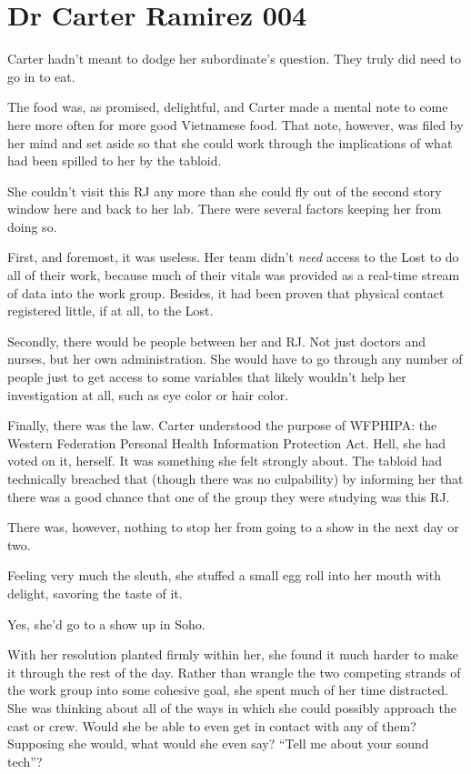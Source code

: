 \chapter*{Dr Carter Ramirez 004}

Carter hadn't meant to dodge her subordinate's question. They truly did need to go in to eat.

The food was, as promised, delightful, and Carter made a mental note to come here more often for more good Vietnamese food. That note, however, was filed by her mind and set aside so that she could work through the implications of what had been spilled to her by the tabloid.

She couldn't visit this RJ any more than she could fly out of the second story window here and back to her lab. There were several factors keeping her from doing so.

First, and foremost, it was useless. Her team didn't \emph{need} access to the Lost to do all of their work, because much of their vitals was provided as a real-time stream of data into the work group. Besides, it had been proven that physical contact registered little, if at all, to the Lost.

Secondly, there would be people between her and RJ. Not just doctors and nurses, but her own administration. She would have to go through any number of people just to get access to some variables that likely wouldn't help her investigation at all, such as eye color or hair color.

Finally, there was the law. Carter understood the purpose of WFPHIPA: the Western Federation Personal Health Information Protection Act. Hell, she had voted on it, herself. It was something she felt strongly about. The tabloid had technically breached that (though there was no culpability) by informing her that there was a good chance that one of the group they were studying was this RJ.

There was, however, nothing to stop her from going to a show in the next day or two.

Feeling very much the sleuth, she stuffed a small egg roll into her mouth with delight, savoring the taste of it.

Yes, she'd go to a show up in Soho.

With her resolution planted firmly within her, she found it much harder to make it through the rest of the day. Rather than wrangle the two competing strands of the work group into some cohesive goal, she spent much of her time distracted. She was thinking about all of the ways in which she could possibly approach the cast or crew. Would she be able to even get in contact with any of them? Supposing she would, what would she even say? ``Tell me about your sound tech''?

